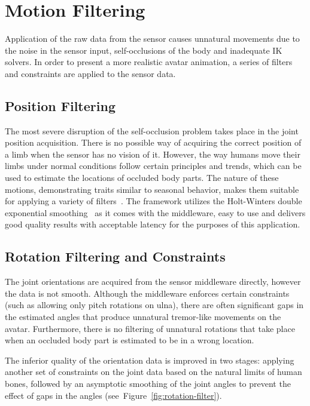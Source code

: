 \section{Motion Filtering}
\label{section_motion_filtering}

Application of the raw data from the sensor causes unnatural movements due to the noise in the sensor input, self-occlusions of the body and inadequate IK solvers.
 In order to present a more realistic avatar animation, a series of filters and constraints are applied to the sensor data. 

\subsection{Position Filtering}
The most severe disruption of the self-occlusion problem takes place in the joint position acquisition. There is no possible way of acquiring the correct position 
of a limb when the sensor has no vision of it. However, the way humans move their limbs under normal conditions follow certain principles and trends,
which can be used to estimate the locations of occluded body parts. The nature of these motions, demonstrating traits similar to seasonal behavior,
makes them suitable for applying a variety of filters~\cite{Azimi2012}. The framework utilizes the Holt-Winters double exponential smoothing~\cite{Holt2004,Kalekar2004}
 as it comes with the middleware, easy to use and delivers good quality results with acceptable latency for the purposes of this application. 

\subsection{Rotation Filtering and Constraints}
The joint orientations are acquired from the sensor middleware directly, however the data is not smooth. Although the middleware enforces certain constraints 
(such as allowing only pitch rotations on ulna), there are often significant gaps in the estimated angles that produce unnatural tremor-like movements on the avatar. 
Furthermore, there is no filtering of unnatural rotations that take place when an occluded body part is estimated to be in a wrong location. 

The inferior quality of the orientation data is improved in two stages: applying another set of constraints on the joint data based on the natural limits of human bones,
 followed by an asymptotic smoothing of the joint angles to prevent the effect of gaps in the angles (see~Figure~\ref{fig:rotation-filter}). 

